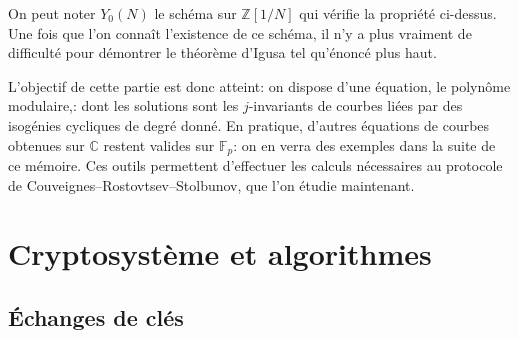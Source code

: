 \documentclass[11pt,a4paper]{article}
\newcommand{\Z}{\mathbb{Z}}
\newcommand{\C}{\mathbb{C}}
\newcommand{\F}{\mathbb{F}}
\newcommand{\vers}{\longrightarrow}
\renewcommand{\v}{\vspace{5mm}}
\theoremstyle{definition}
\begin{document}
%

On peut noter $Y_0(N)$ le schéma sur $\Z[1/N]$ qui vérifie la propriété ci-dessus. Une fois que l'on connaît l'existence de ce schéma, il n'y a plus vraiment de difficulté pour démontrer le théorème d'Igusa tel qu'énoncé plus haut. 

\v

L'objectif de cette partie est donc atteint: on dispose d'une équation, le polynôme modulaire,: dont les solutions sont les $j$-invariants de courbes liées par des isogénies cycliques de degré donné. En pratique, d'autres équations de courbes obtenues sur $\C$ restent valides sur $\F_p$: on en verra des exemples dans la suite de ce mémoire. Ces outils permettent d'effectuer les calculs nécessaires au protocole de Couveignes--Rostovtsev--Stolbunov, que l'on étudie maintenant.

\newpage

\section{Cryptosystème et algorithmes}

\subsection{\'Echanges de clés}
\end{document}
